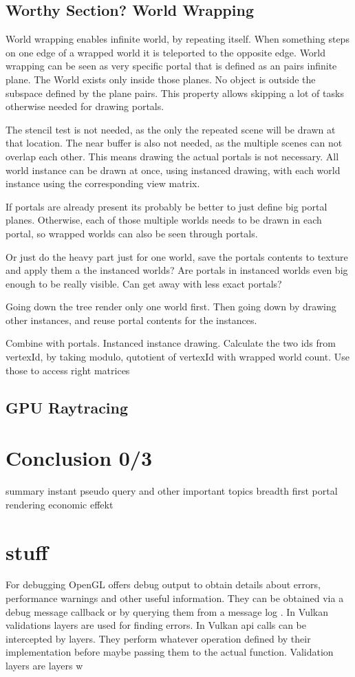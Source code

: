 \subsection{Worthy Section? World Wrapping}
World wrapping enables infinite world, by repeating itself. When something steps on one edge of a wrapped world it is teleported to the opposite edge. World wrapping can be seen as very specific portal that is defined as an pairs infinite plane. The World exists only inside those planes. No object is outside the subspace defined by the plane pairs. This property allows skipping a lot of tasks otherwise needed for drawing portals.

The stencil test is not needed, as the only the repeated scene will be drawn at that location. The near buffer is also not needed, as the multiple scenes can not overlap each other. This means drawing the actual portals is not necessary. All world instance can be drawn at once, using instanced drawing, with each world instance using the corresponding view matrix.

If portals are already present its probably be better to just define big portal planes. Otherwise, each of those multiple worlds needs to be drawn in each portal, so wrapped worlds can also be seen through portals. 

Or just do the heavy part just for one world, save the portals contents to texture and apply them a the instanced worlds? Are portals in instanced worlds even big enough to be really visible. Can get away with less exact portals?

Going down the tree render only one world first. Then going down by drawing other instances, and reuse portal contents for the instances.

Combine with portals. Instanced instance drawing. Calculate the two ids from vertexId, by taking modulo, qutotient of vertexId with wrapped world count. Use those to access right matrices


\subsection{GPU Raytracing}
\section{Conclusion 0/3}

summary
instant pseudo query and other important topics
breadth first portal rendering
economic effekt

\section*{stuff}
For debugging OpenGL offers debug output to obtain details about errors, performance warnings and other useful information. They can be obtained via a debug message callback or by querying them from a message log \cite{khronos:openGL:spec4.6}. In Vulkan validations layers are used for finding errors. In Vulkan \gls{api} calls can be intercepted by layers. They perform whatever operation defined by their implementation before maybe passing them to the actual function. Validation layers are layers w

